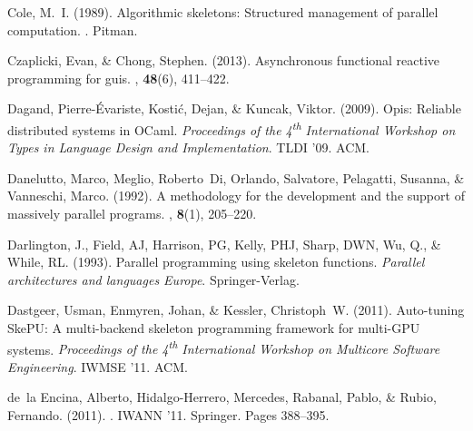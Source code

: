 \documentclass{jfp1}
\DeclareRobustCommand{\xth}{\textsuperscript{th}\xspace}
\DeclareRobustCommand{\xth}{\textsuperscript{th}\xspace}
\begin{document}
\begin{thebibliography}{}
{C}ole, M.~I. (1989).
\newblock Algorithmic skeletons: Structured management of parallel computation.
.
\newblock Pitman.

Czaplicki, Evan, \& Chong, Stephen. (2013).
\newblock Asynchronous functional reactive programming for guis.
, {\bf 48}(6), 411--422.

Dagand, Pierre-\'{E}variste, Kosti\'{c}, Dejan, \& Kuncak, Viktor. (2009).
\newblock Opis: Reliable distributed systems in {OCaml}.
 {\em Proceedings of the 4\xth International
  Workshop on Types in Language Design and Implementation}.
\newblock TLDI '09.
\newblock ACM.

Danelutto, Marco, Meglio, Roberto~Di, Orlando, Salvatore, Pelagatti, Susanna,
  \& Vanneschi, Marco. (1992).
\newblock A methodology for the development and the support of massively
  parallel programs.
, {\bf 8}(1), 205--220.

Darlington, J., Field, AJ, Harrison, PG, Kelly, PHJ, Sharp, DWN, Wu, Q., \&
  While, RL. (1993).
\newblock Parallel programming using skeleton functions.
 {\em Parallel architectures and languages
  Europe}.
\newblock Springer-Verlag.

Dastgeer, Usman, Enmyren, Johan, \& Kessler, Christoph~W. (2011).
\newblock Auto-tuning {SkePU}: A multi-backend skeleton programming framework
  for multi-{GPU} systems.
 {\em Proceedings of the 4\xth International
  Workshop on Multicore Software Engineering}.
\newblock IWMSE '11.
\newblock ACM.

de~la Encina, Alberto, Hidalgo-Herrero, Mercedes, Rabanal, Pablo, \& Rubio,
  Fernando. (2011).
.
\newblock IWANN '11.
\newblock Springer.
\newblock Pages  388--395.


\end{thebibliography}
\end{document}
